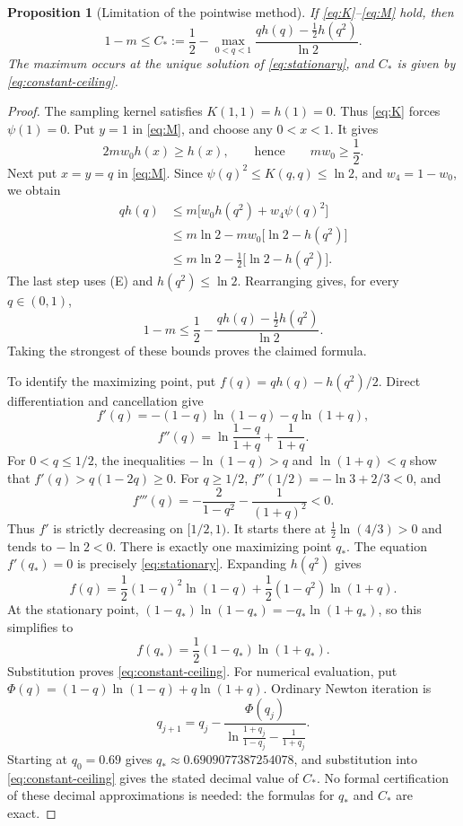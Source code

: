 \documentclass[11pt]{article}
\newtheorem{proposition}[theorem]{Proposition}
\theoremstyle{remark}
\begin{document}
\begin{proposition}[Limitation of the pointwise method]
\label{prop:sharper-ceiling}
If \eqref{eq:K}--\eqref{eq:M} hold, then
\[
1-m\le C_*:=
\frac12-\max_{0<q<1}
\frac{qh(q)-\frac12h(q^2)}{\ln2}.
\]
The maximum occurs at the unique solution of
\eqref{eq:stationary}, and \(C_*\) is given by
\eqref{eq:constant-ceiling}.
\end{proposition}
\begin{proof}
The sampling kernel satisfies \(K(1,1)=h(1)=0\).
Thus \eqref{eq:K} forces \(\psi(1)=0\).
Put \(y=1\) in \eqref{eq:M}, and choose any \(0<x<1\). It gives
\[
2mw_0h(x)\ge h(x),
\qquad\text{hence}\qquad mw_0\ge\frac12.
\tag{E}
\label{eq:endpoint-barrier}
\]
Next put \(x=y=q\) in \eqref{eq:M}. Since
\(\psi(q)^2\le K(q,q)\le\ln2\), and \(w_4=1-w_0\), we obtain
\[
\begin{aligned}
qh(q)
&\le m\bigl[w_0h(q^2)+w_4\psi(q)^2\bigr]\\
&\le m\ln2-mw_0\bigl[\ln2-h(q^2)\bigr]\\
&\le m\ln2-\frac12\bigl[\ln2-h(q^2)\bigr].
\end{aligned}
\]
The last step uses (E) and \(h(q^2)\le\ln2\).
Rearranging gives, for every \(q\in(0,1)\),
\[
1-m\le\frac12-\frac{qh(q)-\frac12h(q^2)}{\ln2}.
\tag{C}
\label{eq:ceiling-each-q}
\]
Taking the strongest of these bounds proves the claimed formula.

To identify the maximizing point, put \(f(q)=qh(q)-h(q^2)/2\).
Direct differentiation and cancellation give
\[
f'(q)=-(1-q)\ln(1-q)-q\ln(1+q),
\]
\[
f''(q)=\ln\frac{1-q}{1+q}+\frac1{1+q}.
\]
For \(0<q\le1/2\), the inequalities
\(-\ln(1-q)>q\) and \(\ln(1+q)<q\) show that
\(f'(q)>q(1-2q)\ge0\).
For \(q\ge1/2\), \(f''(1/2)=-\ln3+2/3<0\), and
\[
f'''(q)=-\frac2{1-q^2}-\frac1{(1+q)^2}<0.
\]
Thus \(f'\) is strictly decreasing on \([1/2,1)\).
It starts there at \(\frac12\ln(4/3)>0\) and tends to
\(-\ln2<0\). There is exactly one maximizing point \(q_*\).
The equation \(f'(q_*)=0\) is precisely
\eqref{eq:stationary}. Expanding \(h(q^2)\) gives
\[
f(q)=\frac12(1-q)^2\ln(1-q)
     +\frac12(1-q^2)\ln(1+q).
\]
At the stationary point,
\((1-q_*)\ln(1-q_*)=-q_*\ln(1+q_*)\), so this simplifies to
\[
f(q_*)=\frac12(1-q_*)\ln(1+q_*).
\]
Substitution proves \eqref{eq:constant-ceiling}.
For numerical evaluation, put
\(\Phi(q)=(1-q)\ln(1-q)+q\ln(1+q)\).
Ordinary Newton iteration is
\[
q_{j+1}=q_j-
\frac{\Phi(q_j)}
{\displaystyle\ln\frac{1+q_j}{1-q_j}-\frac1{1+q_j}}.
\]
Starting at \(q_0=0.69\) gives
\(q_*\approx0.6909077387254078\), and substitution into
\eqref{eq:constant-ceiling} gives the stated decimal value of \(C_*\).
No formal certification of these decimal approximations is needed:
the formulas for \(q_*\) and \(C_*\) are exact.
\end{proof}
\end{document}
